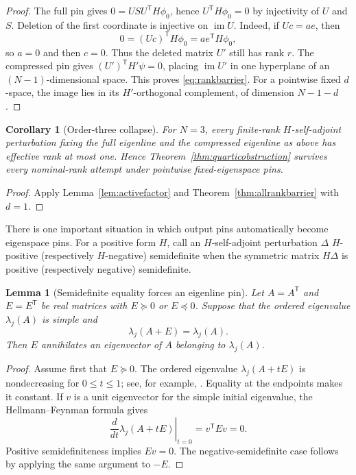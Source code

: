 \documentclass[11pt,reqno]{amsart}
\newtheorem{lemma}[theorem]{Lemma}
\newtheorem{corollary}[theorem]{Corollary}
\theoremstyle{definition}
\theoremstyle{remark}
\begin{document}
\begin{proof}
The full pin gives
$0=USU^{\mathsf T}H\phi_0$, hence $U^{\mathsf T}H\phi_0=0$ by injectivity of
$U$ and $S$.  Deletion of the first coordinate is injective on
$\operatorname{im}U$.  Indeed, if $Uc=ae$, then
\[
 0=(Uc)^{\mathsf T}H\phi_0=a e^{\mathsf T}H\phi_0,
\]
so $a=0$ and then $c=0$.  Thus the deleted matrix $U'$ still has rank $r$.
The compressed pin gives $(U')^{\mathsf T}H'\psi=0$, placing
$\operatorname{im}U'$ in one hyperplane of an $(N-1)$-dimensional space.
This proves \eqref{eq:rankbarrier}.  For a pointwise fixed $d$-space, the
image lies in its $H'$-orthogonal complement, of dimension $N-1-d$.
\end{proof}

\begin{corollary}[Order-three collapse]\label{cor:orderthreecollapse}
For $N=3$, every finite-rank $H$-self-adjoint perturbation fixing the full
eigenline and the compressed eigenline as above has effective rank at most
one.  Hence Theorem~\ref{thm:quarticobstruction} survives every nominal-rank
attempt under pointwise fixed-eigenspace pins.
\end{corollary}

\begin{proof}
Apply Lemma~\ref{lem:activefactor} and
Theorem~\ref{thm:allrankbarrier} with $d=1$.
\end{proof}

There is one important situation in which output pins automatically become
eigenspace pins.  For a positive form $H$, call an $H$-self-adjoint
perturbation $\Delta$ $H$-positive (respectively $H$-negative) semidefinite
when the symmetric matrix $H\Delta$ is positive (respectively negative)
semidefinite.

\begin{lemma}[Semidefinite equality forces an eigenline pin]
\label{lem:semidefinite-pin}
Let $A=A^{\mathsf T}$ and $E=E^{\mathsf T}$ be real matrices with
$E\succeq0$ or $E\preceq0$.  Suppose that the ordered eigenvalue
$\lambda_j(A)$ is simple and
\[
 \lambda_j(A+E)=\lambda_j(A).
\]
Then $E$ annihilates an eigenvector of $A$ belonging to $\lambda_j(A)$.
\end{lemma}

\begin{proof}
Assume first that $E\succeq0$.  The ordered eigenvalue
$\lambda_j(A+tE)$ is nondecreasing for $0\leq t\leq1$; see, for example,
\cite{bhatia}.  Equality at the endpoints makes it constant.  If $v$ is a
unit eigenvector for the simple initial eigenvalue, the
Hellmann--Feynman formula gives
\[
 \left.\frac{d}{dt}\lambda_j(A+tE)\right|_{t=0}=v^{\mathsf T}Ev=0.
\]
Positive semidefiniteness implies $Ev=0$.  The negative-semidefinite case
follows by applying the same argument to $-E$.
\end{proof}
\end{document}
